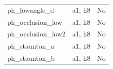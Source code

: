 \begin{longtable}{>{\raggedright\arraybackslash}p{.47\linewidth}>{\raggedright\arraybackslash}p{.25\linewidth}l}
ph\_\allowbreak{}lowangle\_\allowbreak{}d & %
a1, h8 & %
No \\ %

ph\_\allowbreak{}occlusion\_\allowbreak{}low & %
a1, h8 & %
No \\ %

ph\_\allowbreak{}occlusion\_\allowbreak{}low2 & %
a1, h8 & %
No \\ %

ph\_\allowbreak{}staunton\_\allowbreak{}a & %
a1, h8 & %
No \\ %

ph\_\allowbreak{}staunton\_\allowbreak{}b & %
a1, h8 & %
No \\ %


\end{longtable}
